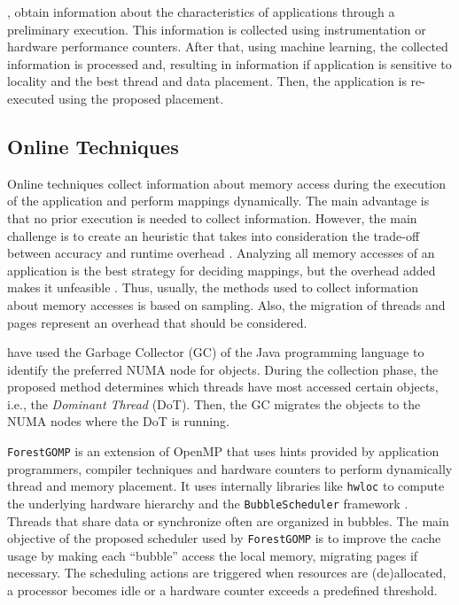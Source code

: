 , obtain information about the characteristics of applications through a preliminary execution. This information is collected using instrumentation or hardware performance counters. After that, using machine learning, the collected information is processed and, resulting in information if application is sensitive to locality and the best thread and data placement. Then, the application is re-executed using the proposed placement.


\subsection{Online Techniques}\label{sect:onlineTec}

Online techniques collect information about  memory access during the execution of the application and perform  mappings dynamically. The main advantage is that no prior execution is needed to collect information. However, the main challenge is to create an heuristic that takes into consideration the trade-off between accuracy and runtime overhead \cite{Diener:2016Sur}. Analyzing all memory accesses of an application is the best strategy for deciding mappings, but the overhead added makes it unfeasible \cite{Cruz:2018}. Thus, usually, the methods used to collect information about memory accesses is based on sampling. Also, the migration of threads and  pages represent an overhead that should be considered.

 have used the Garbage Collector (GC) of the Java programming language to identify the preferred NUMA node for objects. During the collection phase, the proposed method determines which threads have most accessed certain objects, i.e., the \emph{Dominant Thread} (DoT). Then, the GC migrates the objects to the NUMA nodes where the DoT is running.

\texttt{ForestGOMP} \cite{Broquedis:2010} is an extension of OpenMP that uses hints provided by application programmers, compiler techniques and hardware counters to perform dynamically thread and memory placement. It uses internally libraries like \texttt{hwloc} to compute the underlying hardware hierarchy and the \texttt{BubbleScheduler} framework \cite{Thibault:2007}. Threads that share data or synchronize often are organized in bubbles. The main objective of the proposed scheduler used by \texttt{ForestGOMP} is to improve the cache usage by making each ``bubble'' access the local memory, migrating pages if necessary. The scheduling actions are triggered when resources are (de)allocated, a processor becomes idle or a hardware counter exceeds a predefined threshold.

